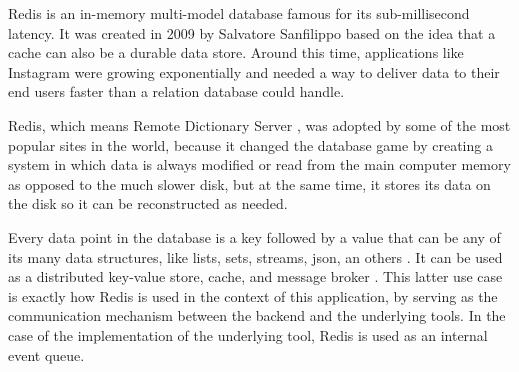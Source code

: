 Redis is an in-memory multi-model database famous for its sub-millisecond
latency. It was created in 2009 by Salvatore Sanfilippo 
based on the idea that a cache can also be a durable data store. Around this
time, applications like Instagram  were growing
exponentially and needed a way to deliver data to their end users faster than a
relation database could handle.

Redis, which means Remote Dictionary Server , was adopted
by some of the most popular sites in the world, because it changed the database
game by creating a system in which data is always modified or read from the
main computer memory as opposed to the much slower disk, but at the same time,
it stores its data on the disk so it can be reconstructed as needed.

Every data point in the database is a key followed by a value that can be any
of its many data structures, like lists, sets, streams, json, an others
. It can be used as a distributed key-value store,
cache, and message broker . This latter use case is exactly
how Redis is used in the context of this application, by serving as the
communication mechanism between the backend and the underlying tools. In the
case of the implementation of the underlying tool, Redis is used as an internal
event queue.
